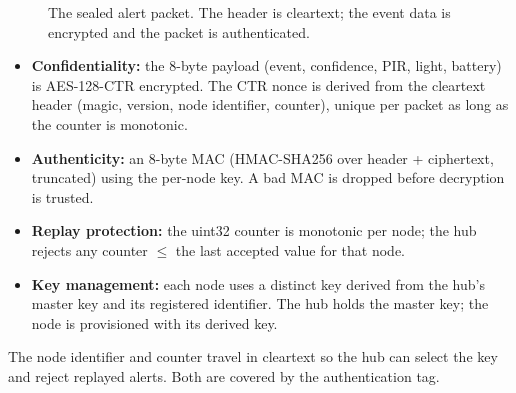 \documentclass[12pt,a4paper]{report}
\begin{document}
\begin{figure}[htbp]
\centering
{}
\caption{The sealed alert packet. The header is cleartext; the
event data is encrypted and the packet is authenticated.}
\label{fig:packet}
\end{figure}

\begin{itemize}
\item \textbf{Confidentiality:} the 8-byte payload (event, confidence,
  PIR, light, battery) is AES-128-CTR encrypted. The CTR nonce is
  derived from the cleartext header (magic, version, node identifier,
  counter), unique per packet as long as the counter is monotonic.
\item \textbf{Authenticity:} an 8-byte MAC (HMAC-SHA256 over header
  + ciphertext, truncated) using the per-node key. A bad MAC is
  dropped before decryption is trusted.
\item \textbf{Replay protection:} the uint32 counter is monotonic per
  node; the hub rejects any counter $\leq$ the last accepted value for
  that node.
\item \textbf{Key management:} each node uses a distinct key derived
  from the hub's master key and its registered identifier. The hub
  holds the master key; the node is provisioned with its derived key.
\end{itemize}

The node identifier and counter travel in cleartext so the hub can
select the key and reject replayed alerts. Both are covered by the
authentication tag.
\end{document}

